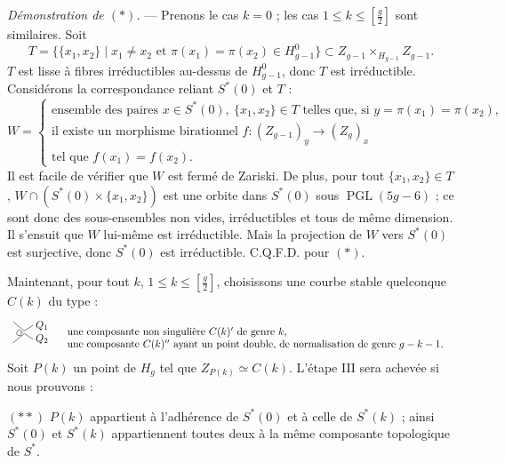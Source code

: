 \documentclass[10pt]{article}
\newcommand{\PGL}{\operatorname{PGL}}
\begin{document}
\noindent\emph{Démonstration de $(*)$.} --- Prenons le cas $k=0$ ; les cas $1\leq k\leq\left[\frac g2\right]$ sont similaires. Soit
\[
T=\{\{x_1,x_2\}\mid x_1\ne x_2\text{ et }\pi(x_1)=\pi(x_2)\in H^0_{g-1}\}\subset Z_{g-1}\times_{H_{g-1}}Z_{g-1}.
\]
$T$ est lisse à fibres irréductibles au-dessus de $H^0_{g-1}$, donc $T$ est irréductible. Considérons la correspondance reliant $S^*(0)$ et $T$ :
\[
W=\left\{\begin{array}{l}
\text{ensemble des paires }x\in S^*(0),\ \{x_1,x_2\}\in T\text{ telles que, si }y=\pi(x_1)=\pi(x_2),\\
\text{il existe un morphisme birationnel } f:(Z_{g-1})_y\to (Z_g)_x\\
\text{tel que }f(x_1)=f(x_2).
\end{array}\right.
\]
Il est facile de vérifier que $W$ est fermé de Zariski. De plus, pour tout $\{x_1,x_2\}\in T$, $W\cap(S^*(0)\times\{x_1,x_2\})$ est une orbite dans $S^*(0)$ sous $\PGL(5g-6)$ ; ce sont donc des sous-ensembles non vides, irréductibles et tous de même dimension. Il s'ensuit que $W$ lui-même est irréductible. Mais la projection de $W$ vers $S^*(0)$ est surjective, donc $S^*(0)$ est irréductible. C.Q.F.D. pour $(*)$.

Maintenant, pour tout $k$, $1\leq k\leq\left[\frac g2\right]$, choisissons une courbe stable quelconque $C(k)$ du type :
\[
\begin{array}{cl}
\begin{tikzpicture}[scale=.42,baseline=-2ex,line width=.45pt]
\draw (-.8,.85)--(.1,.1);
\draw (-.8,-.85)--(.1,-.1);
\draw (.1,.1)--(.8,.55);
\draw (.1,-.1)--(.8,-.55);
\draw (-.28,.23).. controls (-.65,.05) and (-.57,-.4)..(-.12,-.23);
\draw (-.25,.2)--(-.05,-.05);
\draw (-.25,-.2)--(-.05,.05);
\node[right] at (.72,.54) {$Q_1$};
\node[right] at (.72,-.54) {$Q_2$};
\end{tikzpicture}
&\begin{array}{l}
\text{une composante non singulière }C(k)'\text{ de genre }k,\\
\text{une composante }C(k)''\text{ ayant un point double, de normalisation de genre }g-k-1.
\end{array}
\end{array}
\]
Soit $P(k)$ un point de $H_g$ tel que $Z_{P(k)}\simeq C(k)$. L'étape III sera achevée si nous prouvons :

\medskip
\noindent$(**)$ $P(k)$ appartient à l'adhérence de $S^*(0)$ et à celle de $S^*(k)$ ; ainsi $S^*(0)$ et $S^*(k)$ appartiennent toutes deux à la même composante topologique de $S^*$.
\end{document}
